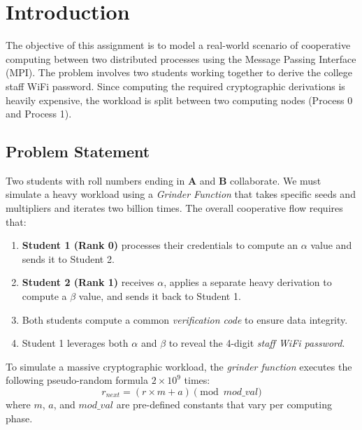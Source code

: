 \documentclass[11pt]{article}
\begin{document}
\section{Introduction}

The objective of this assignment is to model a real-world scenario of cooperative computing between two distributed processes using the Message Passing Interface (MPI). The problem involves two students working together to derive the college staff WiFi password. Since computing the required cryptographic derivations is heavily expensive, the workload is split between two computing nodes (Process 0 and Process 1).

\subsection{Problem Statement}
Two students with roll numbers ending in \textbf{A} and \textbf{B} collaborate. We must simulate a heavy workload using a \textit{Grinder Function} that takes specific seeds and multipliers and iterates two billion times. The overall cooperative flow requires that:
\begin{enumerate}
    \item \textbf{Student 1 (Rank 0)} processes their credentials to compute an $\alpha$ value and sends it to Student 2.
    \item \textbf{Student 2 (Rank 1)} receives $\alpha$, applies a separate heavy derivation to compute a $\beta$ value, and sends it back to Student 1.
    \item Both students compute a common \textit{verification code} to ensure data integrity.
    \item Student 1 leverages both $\alpha$ and $\beta$ to reveal the 4-digit \textit{staff WiFi password}.
\end{enumerate}

\begin{shadedbox}
To simulate a massive cryptographic workload, the \textit{grinder function} executes the following pseudo-random formula \(2 \times 10^9\) times:
\begin{equation}
    r_{next} = (r \times m + a) \pmod{mod\_val}
\end{equation}
where $m$, $a$, and $mod\_val$ are pre-defined constants that vary per computing phase.
\end{shadedbox}
\end{document}

